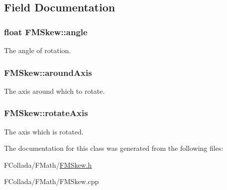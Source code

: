 \subsection{Field Documentation}
\hypertarget{classFMSkew_a3001b0a58b660f6b4677aa6e0381e25e}{
\subsubsection[{angle}]{\setlength{\rightskip}{0pt plus 5cm}float {\bf FMSkew::angle}}}
\label{classFMSkew_a3001b0a58b660f6b4677aa6e0381e25e}
The angle of rotation. \hypertarget{classFMSkew_aeb3dfd593df446ebdc89996b803ff5f0}{
\subsubsection[{aroundAxis}]{ {\bf FMSkew::aroundAxis}}}
\label{classFMSkew_aeb3dfd593df446ebdc89996b803ff5f0}
The axis around which to rotate. \hypertarget{classFMSkew_a7cf70bef4d980753e946c20ddbe24e80}{
\subsubsection[{rotateAxis}]{ {\bf FMSkew::rotateAxis}}}
\label{classFMSkew_a7cf70bef4d980753e946c20ddbe24e80}
The axis which is rotated. 

The documentation for this class was generated from the following files:\begin{DoxyCompactItemize}
\item 
FCollada/FMath/\hyperlink{FMSkew_8h}{FMSkew.h}\item 
FCollada/FMath/FMSkew.cpp\end{DoxyCompactItemize}
